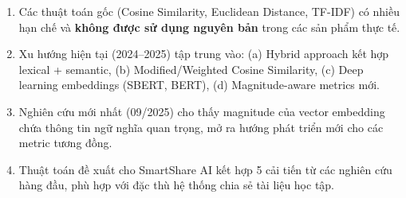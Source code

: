 \documentclass[12pt,a4paper]{article}
\begin{document}
\begin{enumerate}
    \item Các thuật toán gốc (Cosine Similarity, Euclidean Distance, TF-IDF) có nhiều hạn chế và \textbf{không được sử dụng nguyên bản} trong các sản phẩm thực tế.
    \item Xu hướng hiện tại (2024--2025) tập trung vào: (a) Hybrid approach kết hợp lexical + semantic, (b) Modified/Weighted Cosine Similarity, (c) Deep learning embeddings (SBERT, BERT), (d) Magnitude-aware metrics mới.
    \item Nghiên cứu mới nhất (09/2025) cho thấy magnitude của vector embedding chứa thông tin ngữ nghĩa quan trọng, mở ra hướng phát triển mới cho các metric tương đồng.
    \item Thuật toán đề xuất cho SmartShare AI kết hợp 5 cải tiến từ các nghiên cứu hàng đầu, phù hợp với đặc thù hệ thống chia sẻ tài liệu học tập.
\end{enumerate}
\end{document}
